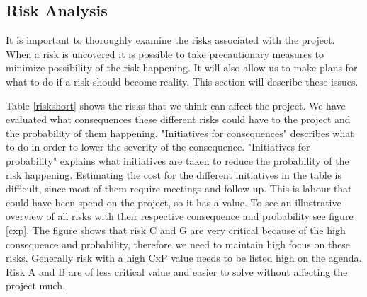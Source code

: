 \subsection{Risk Analysis}
\label{risk}
It is important to thoroughly examine the risks associated with the project. When a risk is uncovered it is possible to take precautionary measures to minimize possibility of the risk happening. It will also allow us to make plans for what to do if a risk should become reality. This section will describe these issues.

Table \ref{riskshort} shows the risks that we think can affect the project. 
We have evaluated what consequences these different risks could have to the project and the probability of them happening.
"Initiatives for consequences" describes what to do in order to lower the severity of the consequence.
"Initiatives for probability" explains what initiatives are taken to reduce the probability of the risk happening.
Estimating the cost for the different initiatives in the table is difficult, since most of them require meetings and follow up. 
This is labour that could have been spend on the project, so it has a value. 
To see an illustrative overview of all risks with their respective consequence and probability see figure \ref{cxp}.
The figure shows that risk C and G are very critical because of the high consequence and probability, therefore we need to maintain high focus on these risks. Generally risk with a high CxP value needs to be listed high on the agenda. 
Risk A and B are of less critical value and easier to solve without affecting the project much.

